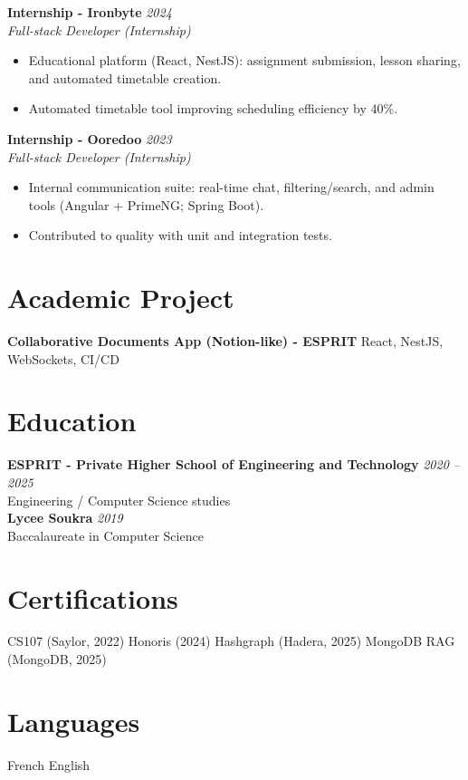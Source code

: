 \documentclass[10pt,a4paper]{article}
\begin{document}
\textbf{Internship - Ironbyte} \hfill \textit{2024}\\
\textit{Full-stack Developer (Internship)}
\begin{itemize}
  \item Educational platform (React, NestJS): assignment submission, lesson sharing, and automated timetable creation.
  \item Automated timetable tool improving scheduling efficiency by 40\%.
\end{itemize}

\textbf{Internship - Ooredoo} \hfill \textit{2023}\\
\textit{Full-stack Developer (Internship)}
\begin{itemize}
  \item Internal communication suite: real-time chat, filtering/search, and admin tools (Angular + PrimeNG; Spring Boot).
  \item Contributed to quality with unit and integration tests.
\end{itemize}

\section*{Academic Project}
\textbf{Collaborative Documents App (Notion-like) - ESPRIT} \textbar{} React, NestJS, WebSockets, CI/CD

\section*{Education}
\textbf{ESPRIT - Private Higher School of Engineering and Technology} \hfill \textit{2020 -- 2025}\\
Engineering / Computer Science studies\\
\vspace{2pt}
\textbf{Lycee Soukra} \hfill \textit{2019}\\
Baccalaureate in Computer Science

\section*{Certifications}
CS107 (Saylor, 2022) \textbar{} Honoris (2024) \textbar{} Hashgraph (Hadera, 2025) \textbar{} MongoDB RAG (MongoDB, 2025)

\section*{Languages}
French \textbar{} English
\end{document}
